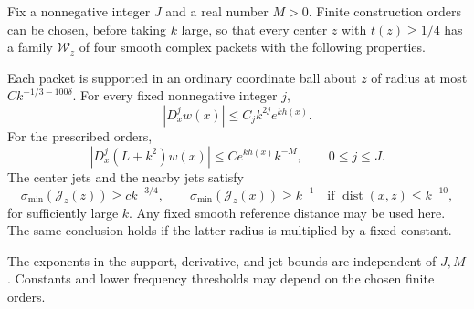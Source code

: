 \begin{proposition}\label{prop:packets}
Fix a nonnegative integer \(J\) and a real number \(M>0\). Finite
construction orders can be chosen, before taking \(k\) large, so that
every center \(z\) with \(t(z)\ge1/4\) has a family \(\mathcal W_z\) of
four smooth complex packets with the following properties.

Each packet is supported in an ordinary coordinate ball about \(z\)
of radius at most \(Ck^{-1/3-100\delta}\). For every fixed
nonnegative integer \(j\),
\begin{equation}\label{eq:packet-derivatives}
 |D_x^j w(x)|\le C_j k^{2j}e^{kh(x)}.
\end{equation}
For the prescribed orders,
\begin{equation}\label{eq:packet-residual}
 |D_x^j(L+k^2)w(x)|\le C e^{kh(x)}k^{-M},
 \qquad 0\le j\le J.
\end{equation}
The center jets and the nearby jets satisfy
\begin{equation}\label{eq:jet-span}
 \sigma_{\min}(\mathcal J_z(z))\ge c k^{-3/4},\qquad
 \sigma_{\min}(\mathcal J_z(x))\ge k^{-1}
 \quad\text{if }\operatorname{dist}(x,z)\le k^{-10},
\end{equation}
for sufficiently large \(k\). Any fixed smooth reference distance
may be used here. The same conclusion holds if the latter radius
is multiplied by a fixed constant.

The exponents in the support, derivative, and jet bounds are
independent of \(J,M\). Constants and lower frequency thresholds may
depend on the chosen finite orders.
\end{proposition}

